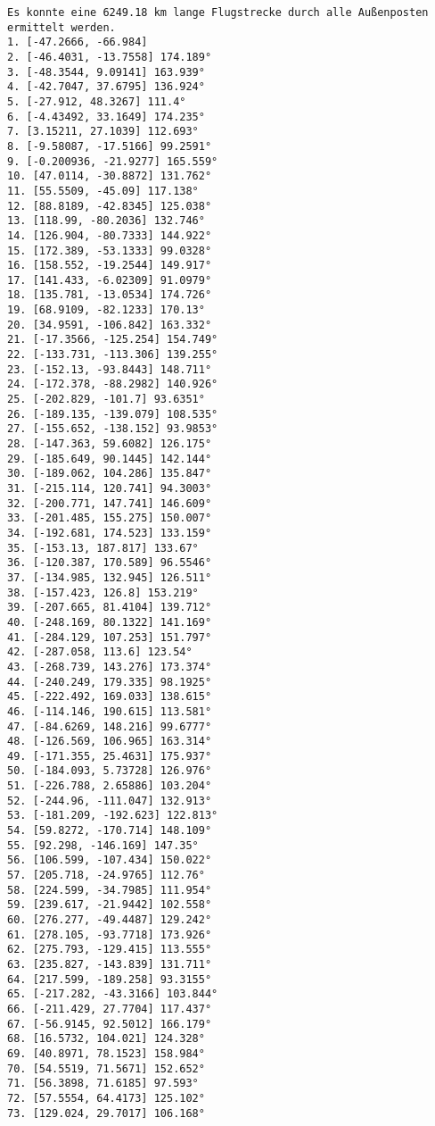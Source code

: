 \documentclass[a4paper,10pt,ngerman]{scrartcl}
\begin{document}
    \begin{lstlisting}[frame=single, title=Programmausgabe wenigerkrumm7.txt, breaklines=true,label={lst:lstlisting4}]
Es konnte eine 6249.18 km lange Flugstrecke durch alle Außenposten ermittelt werden.
1. [-47.2666, -66.984]
2. [-46.4031, -13.7558] 174.189°
3. [-48.3544, 9.09141] 163.939°
4. [-42.7047, 37.6795] 136.924°
5. [-27.912, 48.3267] 111.4°
6. [-4.43492, 33.1649] 174.235°
7. [3.15211, 27.1039] 112.693°
8. [-9.58087, -17.5166] 99.2591°
9. [-0.200936, -21.9277] 165.559°
10. [47.0114, -30.8872] 131.762°
11. [55.5509, -45.09] 117.138°
12. [88.8189, -42.8345] 125.038°
13. [118.99, -80.2036] 132.746°
14. [126.904, -80.7333] 144.922°
15. [172.389, -53.1333] 99.0328°
16. [158.552, -19.2544] 149.917°
17. [141.433, -6.02309] 91.0979°
18. [135.781, -13.0534] 174.726°
19. [68.9109, -82.1233] 170.13°
20. [34.9591, -106.842] 163.332°
21. [-17.3566, -125.254] 154.749°
22. [-133.731, -113.306] 139.255°
23. [-152.13, -93.8443] 148.711°
24. [-172.378, -88.2982] 140.926°
25. [-202.829, -101.7] 93.6351°
26. [-189.135, -139.079] 108.535°
27. [-155.652, -138.152] 93.9853°
28. [-147.363, 59.6082] 126.175°
29. [-185.649, 90.1445] 142.144°
30. [-189.062, 104.286] 135.847°
31. [-215.114, 120.741] 94.3003°
32. [-200.771, 147.741] 146.609°
33. [-201.485, 155.275] 150.007°
34. [-192.681, 174.523] 133.159°
35. [-153.13, 187.817] 133.67°
36. [-120.387, 170.589] 96.5546°
37. [-134.985, 132.945] 126.511°
38. [-157.423, 126.8] 153.219°
39. [-207.665, 81.4104] 139.712°
40. [-248.169, 80.1322] 141.169°
41. [-284.129, 107.253] 151.797°
42. [-287.058, 113.6] 123.54°
43. [-268.739, 143.276] 173.374°
44. [-240.249, 179.335] 98.1925°
45. [-222.492, 169.033] 138.615°
46. [-114.146, 190.615] 113.581°
47. [-84.6269, 148.216] 99.6777°
48. [-126.569, 106.965] 163.314°
49. [-171.355, 25.4631] 175.937°
50. [-184.093, 5.73728] 126.976°
51. [-226.788, 2.65886] 103.204°
52. [-244.96, -111.047] 132.913°
53. [-181.209, -192.623] 122.813°
54. [59.8272, -170.714] 148.109°
55. [92.298, -146.169] 147.35°
56. [106.599, -107.434] 150.022°
57. [205.718, -24.9765] 112.76°
58. [224.599, -34.7985] 111.954°
59. [239.617, -21.9442] 102.558°
60. [276.277, -49.4487] 129.242°
61. [278.105, -93.7718] 173.926°
62. [275.793, -129.415] 113.555°
63. [235.827, -143.839] 131.711°
64. [217.599, -189.258] 93.3155°
65. [-217.282, -43.3166] 103.844°
66. [-211.429, 27.7704] 117.437°
67. [-56.9145, 92.5012] 166.179°
68. [16.5732, 104.021] 124.328°
69. [40.8971, 78.1523] 158.984°
70. [54.5519, 71.5671] 152.652°
71. [56.3898, 71.6185] 97.593°
72. [57.5554, 64.4173] 125.102°
73. [129.024, 29.7017] 106.168°

\end{lstlisting}
\end{document}
